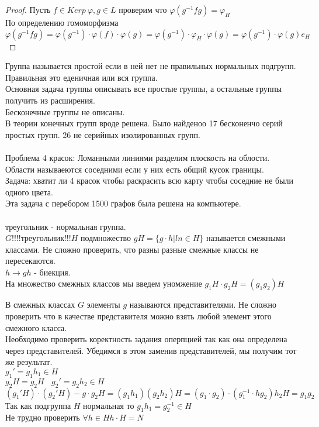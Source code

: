 \begin{proof}
	Пусть $f \in Kerp~\varphi, g\in L$ проверим что $\varphi(g^{-1}
	fg) = \varphi_H$\\
	По определению гомоморфизма $\varphi(g^{-1} fg) = \varphi(g^{-1}) \cdot
	\varphi(f) \cdot \varphi(g) = \varphi(g^{-1}) \cdot \varphi_H \cdot
	\varphi(g) = \varphi(g^{-1}) \cdot \varphi(g) e_H$
\end{proof}

Группа называется простой если в ней нет не правильных нормальных подгрупп.\\
Правильная это еденичная или вся группа.\\

Основная задача группы описывать все простые группы, а остальные группы получить
из расширения.\\

Бесконечные группы не описаны.\\

В теории конечных групп вроде решена. Было найденоо 17 бесконенчо серий простых
групп. 26 не серийных изолированных групп.\\\\

Проблема 4 красок: Ломанными линиями разделим плоскость на облости. Области
называеются соседними если у них есть общий кусок границы.\\
Задача: хватит ли 4 красок чтобы раскрасить всю карту чтобы соседние не были
одного цвета.\\
Эта задача с перебором 1500 графов была решена на компьютере.\\

\\
треугольник - нормальная группа.\\
$G 	!!!!треугольник!!! H$ подмножество $gH = \{g\cdot h | ln \in H\}$ называется
смежными классами. Не сложно проверить, что разны разные смежные классы не
пересекаются.\\
$h \to gh$ - биекция.\\
На множество смежных классов мы введем уномжение $g_1H\cdot g_2H = (g_1g_2)H$\\

\begin{defin}
	В смежных классах $G$ элементы $g$ называются представителями. Не
	сложно проверить что в качестве представителя можно взять любой элемент этого
	смежного класса.\\
	Необходимо проверить коректность задания оперпцией так как она определена через
	представителей. Убедимся в этом заменив представителей, мы получим тот же
	результат.\\
	$g_1' = g_1 h_1 \in H$\\
	$g_2 H = g_2 H ~~~~ g_2' = g_2 h_2 \in H$\\
	$
		(g_1' H)\cdot(g_2' H) - g\cdot g_2 H = (g_1 h_1)(g_2 h_2)H =
		(g_1 \cdot g_2)\cdot(g_{1}^{-1} \cdot hg_2)h_2 H = g_1 g_2
	$\\
	Так как подгруппа $H$ нормальная то $g_1 h_1 = g_{2}^{-1} \in H$\\
	Не трудно проверить $\forall h\in H h\cdot H = N$\\
\end{defin}

